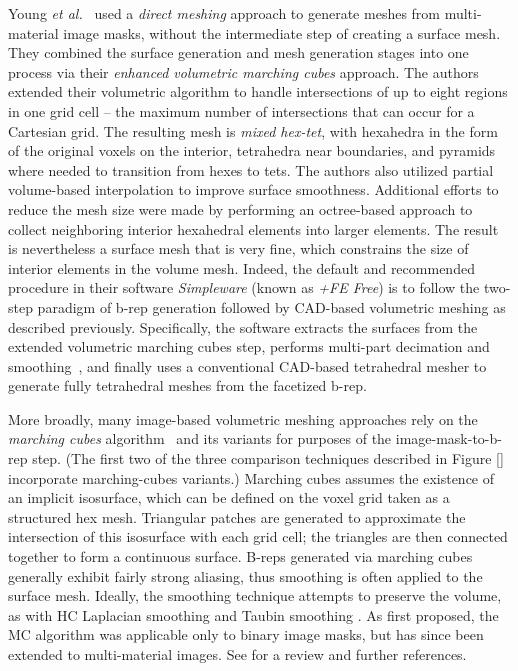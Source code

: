 Young \textit{et al.}~\cite{young_2008} used a \textit{direct meshing} approach to generate meshes from multi-material image masks, without the intermediate step of creating a surface mesh. They combined the surface generation and mesh generation stages into one process via their \textit{enhanced volumetric marching cubes} approach.  The authors extended their volumetric algorithm to handle intersections of up to eight regions in one grid cell -- the maximum number of intersections that can occur for a Cartesian grid.  The resulting mesh is \textit{mixed hex-tet}, with hexahedra in the form of the original voxels on the interior, tetrahedra near boundaries, and pyramids where needed to transition from hexes to tets. The authors also utilized partial volume-based interpolation to improve surface smoothness. Additional efforts to reduce the mesh size were made by performing an octree-based approach to collect neighboring interior hexahedral elements into larger elements.  The result is nevertheless a surface mesh that is very fine, which constrains the size of interior elements in the volume mesh.  Indeed, the default and recommended procedure in their software \textit{Simpleware} (known as \textit{+FE Free}) is to follow the two-step paradigm of b-rep generation followed by CAD-based volumetric meshing as described previously. Specifically, the software extracts the surfaces from the extended volumetric marching cubes step, performs multi-part decimation and smoothing~\cite{egst}, and finally uses a conventional CAD-based tetrahedral mesher to generate fully tetrahedral meshes from the facetized b-rep.

More broadly, many image-based volumetric meshing approaches rely on the \textit{marching cubes} algorithm~\cite{lorensen_1987} and its variants for purposes of the image-mask-to-b-rep step.  (The first two of the three comparison techniques described in Figure \ref{} incorporate marching-cubes variants.)  Marching cubes assumes the existence of an implicit isosurface, which can be defined on the voxel grid taken as a structured hex mesh.  Triangular patches are generated to approximate the intersection of this isosurface with each grid cell; the triangles are then connected together to form a continuous surface. B-reps generated via marching cubes generally exhibit fairly strong aliasing, thus smoothing is often applied to the surface mesh.  Ideally, the smoothing technique attempts to preserve the volume, as with HC Laplacian smoothing\cite{vollmer_1999} and Taubin smoothing \cite{taubin1995signal, taubin_1995}.  As first proposed, the MC algorithm was applicable only to binary image masks, but has since been extended to multi-material images.  See \cite{} for a review and further references. 


